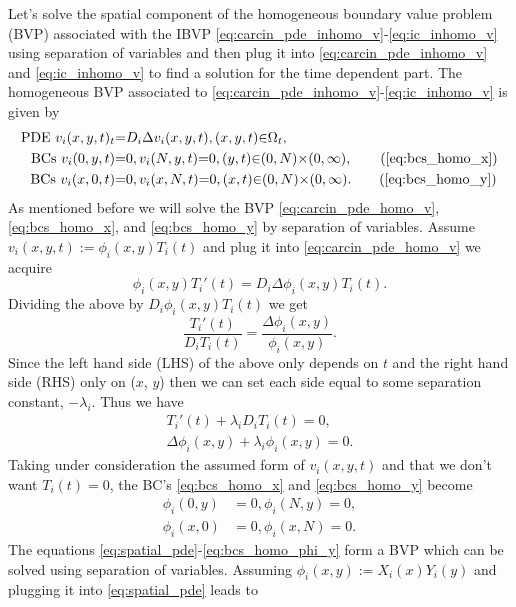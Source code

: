 \documentclass[\main/thesis.tex]{subfiles}
\begin{document}
Let's solve the spatial component of the homogeneous boundary value problem (BVP) associated with the IBVP \eqref{eq:carcin_pde_inhomo_v}-\eqref{eq:ic_inhomo_v} using separation of variables and then plug it into \eqref{eq:carcin_pde_inhomo_v} and \eqref{eq:ic_inhomo_v} to find a solution for the time dependent part.
The homogeneous BVP associated to \eqref{eq:carcin_pde_inhomo_v}-\eqref{eq:ic_inhomo_v} is given by
\begin{align}
\text{PDE } v_i(x, y, t)_t &{=} D_i \Delta v_i(x, y, t), (x, y, t) {\in} \Omega_t,
\label{eq:carcin_pde_homo_v} \\
\text{BCs } v_i(0, y, t) &{=} 0, v_i(N, y, t) {=} 0, (y, t) {\in} (0, N) {\times} (0, \infty), \tag{\ref{eq:bcs_homo_x}} \\
\text{BCs } v_i(x, 0, t) &{=} 0, v_i(x, N, t) {=} 0, (x, t) {\in} (0, N) {\times} (0, \infty). \tag{\ref{eq:bcs_homo_y}} 
\end{align}
As mentioned before we will solve the BVP \eqref{eq:carcin_pde_homo_v}, \eqref{eq:bcs_homo_x}, and \eqref{eq:bcs_homo_y} by separation of variables. Assume $v_i(x, y, t) {:=} \phi_i(x, y)T_i(t)$ and plug it into \eqref{eq:carcin_pde_homo_v} we acquire
\begin{equation*}
\phi_i(x, y)T_i'(t) {=} D_i\Delta \phi_i(x, y)T_i(t).
\end{equation*}
Dividing the above by $D_i\phi_i(x, y)T_i(t)$ we get
\begin{equation*}
\frac{T_i'(t)}{D_iT_i(t)} {=} \frac{\Delta \phi_i(x, y)}{\phi_i(x, y)}.
\end{equation*}
Since the left hand side (LHS) of the above only depends on $t$ and the right hand side (RHS) only on ($x$, $y$) then we can set each side equal to some separation constant, $\minus \lambda_i$. Thus we have
\begin{align}
T_i'(t) {+} \lambda_i D_i T_i(t) {=} 0, \nonumber \\
\Delta \phi_i(x, y) {+} \lambda_i \phi_i(x, y) {=} 0.
\label{eq:spatial_pde}
\end{align}
Taking under consideration the assumed form of $v_i(x, y, t)$ and that we don't want $T_i(t) {=} 0$, the BC's \eqref{eq:bcs_homo_x} and \eqref{eq:bcs_homo_y} become
\begin{align}
\phi_i(0, y) &{=} 0, \phi_i(N, y) {=} 0,
\label{eq:bcs_homo_phi_x} \\
\phi_i(x, 0) &{=} 0, \phi_i(x, N) {=} 0.
\label{eq:bcs_homo_phi_y}
\end{align}
The equations \eqref{eq:spatial_pde}-\eqref{eq:bcs_homo_phi_y} form a BVP which can be solved using separation of variables. Assuming $\phi_i(x, y) {:=} X_i(x)Y_i(y)$ and plugging it into \eqref{eq:spatial_pde} leads to
\end{document}
